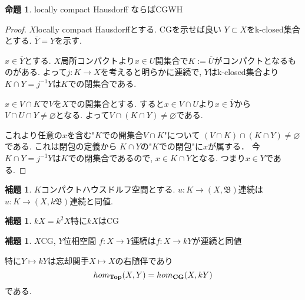 \documentclass[dvipdfmx,a4paper,11pt]{article}
\theoremstyle{definition}
\newtheorem{lem}[thm]{補題}
\newtheorem{prop}[thm]{命題}
\begin{document}
 \begin{tcolorbox}
 [colback = white, colframe = green!35!black, fonttitle = \bfseries,breakable = true]
\begin{prop}\cite[Prop 1.7]{Str}
locally compact Hausdorff ならばCGWH
\end{prop}
\end{tcolorbox}

\begin{proof}
 $X$locally compact Hausdorffとする.
CGを示せば良い
$Y \subset X$をk-closed集合とする.
$\overline{Y} = Y$を示す.

$x \in \overline{Y}$とする.
$X$局所コンパクトより$x \in U$開集合で$K:= \overline{U}$がコンパクトとなるものがある.
よって$j : K \to X$を考えると明らかに連続で, $Y$はk-closed集合より$K\cap Y = j^{-1}Y$は$K$での閉集合である.

$x \in V \cap K$で$V$を$X$での開集合とする.
すると$x \in V \cap U$より$x \in \overline{Y}$から
$V \cap U \cap Y \neq\varnothing$となる.
よって$V \cap (K \cap Y)\neq\varnothing$である.

これより任意の$x$を含む"$K$での開集合$V \cap K$"について
$(V \cap K) \cap  (K \cap Y) \neq \varnothing$である.
これは閉包の定義から
$K \cap Y$の"$K$での閉包"に$x$が属する．
今$K\cap Y = j^{-1}Y$は$K$での閉集合であるので, $x \in K \cap Y$となる. 
つまり$x \in Y$である. 
\end{proof}

 \begin{tcolorbox}
 [colback = white, colframe = green!35!black, fonttitle = \bfseries,breakable = true]
\begin{lem}\cite[Lemma 1.8]{Str}
$K$コンパクトハウスドルフ空間とする.
$u : K \to (X,\mathfrak{B})$連続は$u : K \to (X,k\mathfrak{B})$連続と同値.
\end{lem}
\end{tcolorbox}

 \begin{tcolorbox}
 [colback = white, colframe = green!35!black, fonttitle = \bfseries,breakable = true]
\begin{lem}\cite[Cor1.9]{Str}
$kX =k^2X$特に$kX$はCG
\end{lem}
\end{tcolorbox}

 \begin{tcolorbox}
 [colback = white, colframe = green!35!black, fonttitle = \bfseries,breakable = true]
\begin{lem}\cite[Cor1.10]{Str}
\label{Str-cor1.10}
$X$CG, $Y$位相空間
$f : X \to Y$連続は$f : X \to kY$が連続と同値

特に$Y \mapsto kY$は忘却関手$X \mapsto X$の右随伴であり
$$
hom_{{\bf Top}}(X, Y) = hom_{{\bf CG}}(X, kY)
$$
である. 
\end{lem}
\end{tcolorbox}
\end{document}
